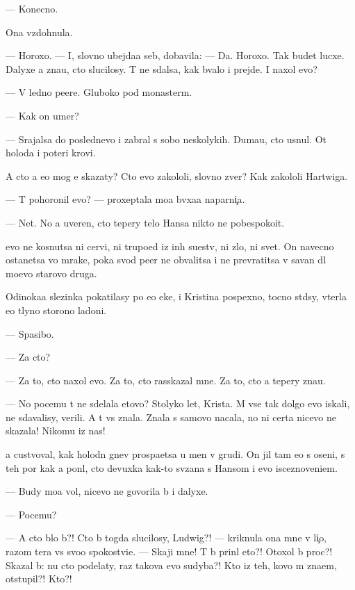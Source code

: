 \documentclass[10pt]{book}
\begin{document}
— Konecno.

Ona vzdohnula.

— Horoxo. — I, slovno ubejda{\y}a seb{\ia}, dobavila: — Da. Horoxo. Tak budet lucxe. Dalyxe {\y}a zna{\y}u, cto slucilosy. T{\yi} ne sdalsa, kak b{\yi}valo i prejde. I naxol {\y}evo?

— V led{\ia}no{\y} pe{\x}ere. Gluboko pod monaster{\e}m.

— Kak on umer?

— Srajalsa do poslednevo i zabral s sobo{\y} neskolykih. Duma{\y}u, cto usnul. Ot holoda i poteri krovi.

A cto {\y}a {\y}e{\x}o mog {\y}e{\y} skazaty? Cto {\y}evo zakololi, slovno zver{\ia}? Kak zakololi Hartwiga.

— T{\yi} pohoronil {\y}evo? — proxeptala mo{\y}a b{\yi}vxa{\y}a naparni{\c}a.

— Net. No {\y}a uveren, cto tepery telo Hansa nikto ne pobespoko{\y}it.

{\Y}evo ne kosnutsa ni cervi, ni trupo{\y}ed{\yi} iz in{\yi}h su{\x}estv, ni zlo, ni svet. On navecno ostanetsa vo mrake, poka svod pe{\x}er{\yi} ne obvalitsa i ne prevratitsa v savan dl{\ia} mo{\y}evo starovo druga.

Odinoka{\y}a slezinka pokatilasy po {\y}e{\y}o {\x}eke, i Kristina pospexno, tocno st{\yi}d{\ia}sy, v{\yi}terla {\y}e{\y}o t{\yi}lyno{\y} storono{\y} ladoni.

— Spasibo.

— Za cto?

— Za to, cto naxol {\y}evo. Za to, cto rasskazal mne. Za to, cto {\y}a tepery zna{\y}u.

— No pocemu t{\yi} ne sdelala etovo? Stolyko let, Krista. M{\yi} vse tak dolgo {\y}evo iskali, ne sdavalisy, verili. A t{\yi} vs{\e} znala. Znala s samovo nacala, no ni certa nicevo ne skazala! Nikomu iz nas!

{\Y}a custvoval, kak holodn{\yi}{\y} gnev pros{\yi}pa{\y}etsa u men{\ia} v grudi. On jil tam {\y}e{\x}o s oseni, s teh por kak {\y}a pon{\ia}l, cto devuxka kak-to sv{\ia}zana s Hansom i {\y}evo isceznoveni{\y}em.

— Budy mo{\y}a vol{\ia}, nicevo ne govorila b{\yi} i dalyxe.

— Pocemu?

— A cto b{\yi}lo b{\yi}?! Cto b{\yi} togda slucilosy, Ludwig?! — kriknula ona mne v li{\c}o, razom ter{\ia}{\y}a vs{\e} svo{\y}o spoko{\y}stvi{\y}e. — Skaji mne! T{\yi} b{\yi} prin{\ia}l eto?! Otoxol b{\yi} proc?! Skazal b{\yi}: nu cto podelaty, raz takova {\y}evo sudyba?! Kto iz teh, kovo m{\yi} zna{\y}em, otstupil?! Kto?!
\end{document}

